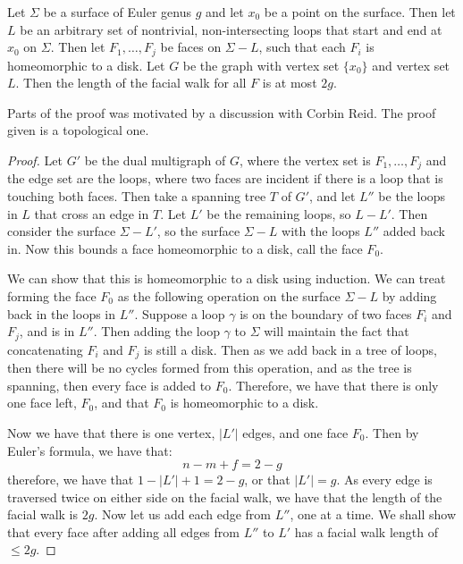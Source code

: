 \begin{lemma}\label{lem:orientable_facial_walks}
	Let \(\Sigma \) be a surface of Euler genus \(g\) and let \(x_0\) be a point on the surface. Then let \(L\) be an arbitrary set of nontrivial, non-intersecting loops that start and end at \(x_0\) on \(\Sigma \). Then let \(F_1, \ldots, F_j\) be faces on \(\Sigma - L\), such that each \(F_i\) is homeomorphic to a disk. Let $G$ be the graph with vertex set $\{x_0 \}$ and vertex set $L$. Then the length of the facial walk for all \(F\) is at most \(2g\).
\end{lemma}

Parts of the proof was motivated by a discussion with Corbin Reid. The proof given is a topological one.

\begin{proof}
	Let \(G'\) be the dual multigraph of $G$, where the vertex set is \(F_1, \ldots, F_j\) and the edge set are the loops, where two faces are incident if there is a loop that is touching both faces. Then take a spanning tree \(T\) of \(G'\), and let \(L''\) be the loops in $L$ that cross an edge in \(T\). Let $L'$ be the remaining loops, so $L - L'$. 
	Then consider the surface \(\Sigma - L'\), so the surface $\Sigma - L$ with the loops $L''$ added back in. Now this bounds a face homeomorphic to a disk, call the face \(F_0\). 
	
	We can show that this is homeomorphic to a disk using induction. We can treat forming the face $F_0$ as the following operation on the surface $\Sigma - L$ by adding back in the loops in $L''$. Suppose a loop $\gamma$ is on the boundary of two faces $F_i$ and $F_j$, and is in $L''$. Then adding the loop $\gamma$ to $\Sigma$ will maintain the fact that concatenating $F_i$ and $F_j$ is still a disk. Then as we add back in a tree of loops, then there will be no cycles formed from this operation, and as the tree is spanning, then every face is added to $F_0$. Therefore, we have that there is only one face left, $F_0$, and that $F_0$ is homeomorphic to a disk. 

	Now we have that there is one vertex, \(|L'|\) edges, and one face \(F_0\). Then by Euler's formula, we have that:
	\begin{equation}
		n - m + f = 2 - g
	\end{equation}
	therefore, we have that \(1 - |L'| + 1 = 2 - g\), or that \(|L'| = g\). As every edge is traversed twice on either side on the facial walk, we have that the length of the facial walk is \(2g\).
	Now let us add each edge from \(L''\), one at a time. We shall show that every face after adding all edges from \(L''\) to \(L'\) has a facial walk length of \(\leq 2g\).


\end{proof}
